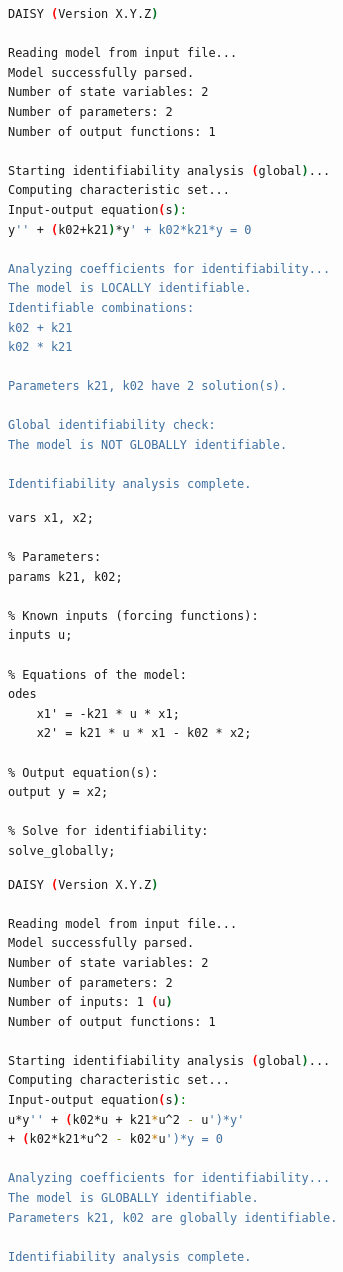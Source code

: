 \documentclass[a4paper,fleqn]{cas-dc}
\theoremstyle{definition}
\begin{document}
\begin{lstlisting}[language=bash, caption=Example terminal output from DAISY for the original model., basicstyle=\ttfamily\footnotesize, backgroundcolor=\color{black!5}, commentstyle=\color{black!60}]
DAISY (Version X.Y.Z)

Reading model from input file...
Model successfully parsed.
Number of state variables: 2
Number of parameters: 2
Number of output functions: 1

Starting identifiability analysis (global)...
Computing characteristic set...
Input-output equation(s):
y'' + (k02+k21)*y' + k02*k21*y = 0

Analyzing coefficients for identifiability...
The model is LOCALLY identifiable.
Identifiable combinations:
k02 + k21
k02 * k21

Parameters k21, k02 have 2 solution(s).

Global identifiability check:
The model is NOT GLOBALLY identifiable.

Identifiability analysis complete.
\end{lstlisting}

\begin{lstlisting}[language={}, caption={DAISY input file for the augmented 2-compartment model with input function u}]
% State variables:
vars x1, x2;

% Parameters:
params k21, k02;

% Known inputs (forcing functions):
inputs u; 

% Equations of the model:
odes
    x1' = -k21 * u * x1;
    x2' = k21 * u * x1 - k02 * x2;

% Output equation(s):
output y = x2;

% Solve for identifiability:
solve_globally;
\end{lstlisting}

\begin{lstlisting}[language=bash, caption=Example terminal output from DAISY for the augmented model., basicstyle=\ttfamily\footnotesize, backgroundcolor=\color{black!5}, commentstyle=\color{black!60}]
DAISY (Version X.Y.Z)

Reading model from input file...
Model successfully parsed.
Number of state variables: 2
Number of parameters: 2
Number of inputs: 1 (u)
Number of output functions: 1

Starting identifiability analysis (global)...
Computing characteristic set...
Input-output equation(s):
u*y'' + (k02*u + k21*u^2 - u')*y' 
+ (k02*k21*u^2 - k02*u')*y = 0 

Analyzing coefficients for identifiability...
The model is GLOBALLY identifiable.
Parameters k21, k02 are globally identifiable.

Identifiability analysis complete.
\end{lstlisting}
\end{document}
